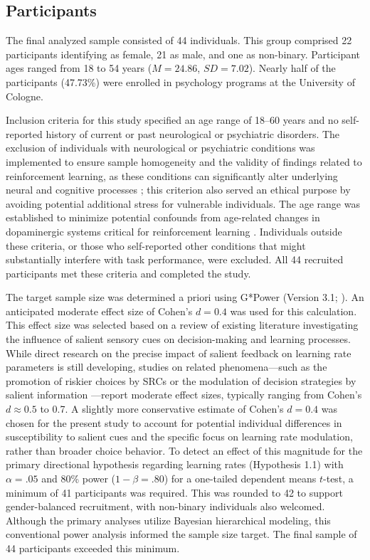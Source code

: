
\subsection{Participants}

The final analyzed sample consisted of 44 individuals. This group comprised 22 participants identifying as female, 21 as male, and one as non-binary. Participant ages ranged from 18 to 54 years ($M = 24.86$, $SD = 7.02$). Nearly half of the participants (47.73\%) were enrolled in psychology programs at the University of Cologne.

Inclusion criteria for this study specified an age range of 18–60 years and no self-reported history of current or past neurological or psychiatric disorders. The exclusion of individuals with neurological or psychiatric conditions was implemented to ensure sample homogeneity and the validity of findings related to reinforcement learning, as these conditions can significantly alter underlying neural and cognitive processes \citep{pike2022}; this criterion also served an ethical purpose by avoiding potential additional stress for vulnerable individuals. The age range was established to minimize potential confounds from age-related changes in dopaminergic systems critical for reinforcement learning \citep{bolenz2019}. Individuals outside these criteria, or those who self-reported other conditions that might substantially interfere with task performance, were excluded. All 44 recruited participants met these criteria and completed the study.

The target sample size was determined a priori using G*Power (Version 3.1; \citealt{faul2007}). An anticipated moderate effect size of Cohen's $d = 0.4$ was used for this calculation. This effect size was selected based on a review of existing literature investigating the influence of salient sensory cues on decision-making and learning processes. While direct research on the precise impact of salient feedback on learning rate parameters is still developing, studies on related phenomena—such as the promotion of riskier choices by SRCs \citep{cherkasova2018, cherkasova2024} or the modulation of decision strategies by salient information \citep{liu2018, mereu2010}—report moderate effect sizes, typically ranging from Cohen's $d \approx 0.5$ to 0.7. A slightly more conservative estimate of Cohen's $d = 0.4$ was chosen for the present study to account for potential individual differences in susceptibility to salient cues and the specific focus on learning rate modulation, rather than broader choice behavior. To detect an effect of this magnitude for the primary directional hypothesis regarding learning rates (Hypothesis 1.1) with $\alpha = .05$ and 80\% power ($1 - \beta = .80$) for a one-tailed dependent means $t$-test, a minimum of 41 participants was required. This was rounded to 42 to support gender-balanced recruitment, with non-binary individuals also welcomed. Although the primary analyses utilize Bayesian hierarchical modeling, this conventional power analysis informed the sample size target. The final sample of 44 participants exceeded this minimum.

